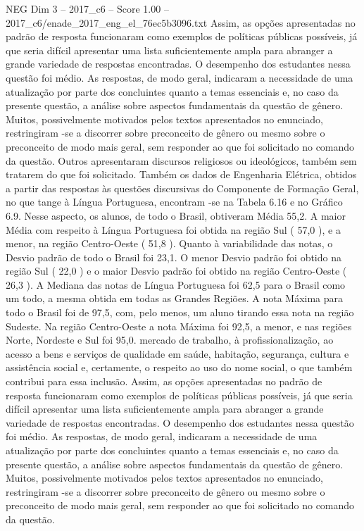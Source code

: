 \begin{textsample}{NEG Dim 3 – 2017\_c6 – Score 1.00 – 2017\_c6/enade\_2017\_eng\_el\_76ec5b3096.txt}
Assim, as opções apresentadas no padrão de resposta funcionaram como exemplos de políticas públicas possíveis, já que seria difícil apresentar uma lista suficientemente ampla para abranger a grande variedade de respostas encontradas.
O desempenho dos estudantes nessa questão foi médio.
As respostas, de modo geral, indicaram a necessidade de uma atualização por parte dos concluintes quanto a temas essenciais e, no caso da presente questão, a análise sobre aspectos fundamentais da questão de gênero.
Muitos, possivelmente motivados pelos textos apresentados no enunciado, restringiram -se a discorrer sobre preconceito de gênero ou mesmo sobre o preconceito de modo mais geral, sem responder ao que foi solicitado no comando da questão.
Outros apresentaram discursos religiosos ou ideológicos, também sem tratarem do que foi solicitado.
Também os dados de Engenharia Elétrica, obtidos a partir das respostas às questões discursivas do Componente de Formação Geral, no que tange à Língua Portuguesa, encontram -se na Tabela 6.16 e no Gráfico 6.9.
Nesse aspecto, os alunos, de todo o Brasil, obtiveram Média 55,2.
A maior Média com respeito à Língua Portuguesa foi obtida na região Sul ( 57,0 ), e a menor, na região Centro-Oeste ( 51,8 ).
Quanto à variabilidade das notas, o Desvio padrão de todo o Brasil foi 23,1.
O menor Desvio padrão foi obtido na região Sul ( 22,0 ) e o maior Desvio padrão foi obtido na região Centro-Oeste ( 26,3 ).
A Mediana das notas de Língua Portuguesa foi 62,5 para o Brasil como um todo, a mesma obtida em todas as Grandes Regiões.
A nota Máxima para todo o Brasil foi de 97,5, com, pelo menos, um aluno tirando essa nota na região Sudeste.
Na região Centro-Oeste a nota Máxima foi 92,5, a menor, e nas regiões Norte, Nordeste e Sul foi 95,0. mercado de trabalho, à profissionalização, ao acesso a bens e serviços de qualidade em saúde, habitação, segurança, cultura e assistência social e, certamente, o respeito ao uso do nome social, o que também contribui para essa inclusão.
Assim, as opções apresentadas no padrão de resposta funcionaram como exemplos de políticas públicas possíveis, já que seria difícil apresentar uma lista suficientemente ampla para abranger a grande variedade de respostas encontradas.
O desempenho dos estudantes nessa questão foi médio.
As respostas, de modo geral, indicaram a necessidade de uma atualização por parte dos concluintes quanto a temas essenciais e, no caso da presente questão, a análise sobre aspectos fundamentais da questão de gênero.
Muitos, possivelmente motivados pelos textos apresentados no enunciado, restringiram -se a discorrer sobre preconceito de gênero ou mesmo sobre o preconceito de modo mais geral, sem responder ao que foi solicitado no comando da questão.

\end{textsample}
